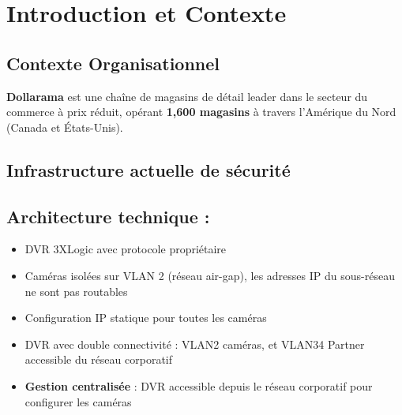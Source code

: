 \documentclass{dollarama}
\begin{document}

\section{Introduction et Contexte}

\subsection{Contexte Organisationnel}

\textbf{Dollarama} est une chaîne de magasins de détail leader dans le secteur du commerce à prix réduit, opérant \textbf{1,600 magasins} à travers l'Amérique du Nord (Canada et États-Unis).

\subsection{Infrastructure actuelle de sécurité}


\subsection{Architecture technique :}
\begin{itemize}
\item DVR 3XLogic avec protocole propriétaire
\item Caméras isolées sur VLAN 2 (réseau air-gap), les adresses IP du sous-réseau ne sont pas routables
\item Configuration IP statique pour toutes les caméras
\item DVR avec double connectivité : VLAN2 caméras, et VLAN34 Partner accessible du réseau corporatif
\item \textbf{Gestion centralisée} : DVR accessible depuis le réseau corporatif pour configurer les caméras
\end{itemize}
\end{document}
